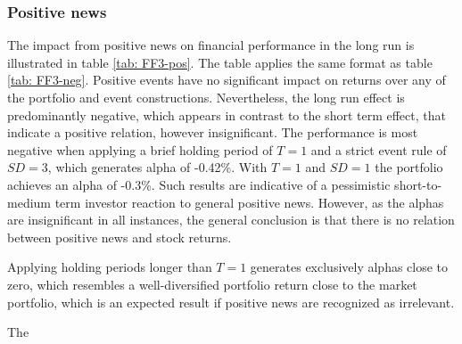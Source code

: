 \subsubsection{Positive news}

The impact from positive news on financial performance in the long run is illustrated in table \ref{tab: FF3-pos}. The table applies the same format as table \ref{tab: FF3-neg}. Positive events have no significant impact on returns over any of the portfolio and event constructions. Nevertheless, the long run effect is predominantly negative, which appears in contrast to the short term effect, that indicate a positive relation, however insignificant. The performance is most negative when applying a brief holding period of $T=1$ and a strict event rule of $SD = 3$, which generates alpha of -0.42\%. With $T=1$ and $SD=1$ the portfolio achieves an alpha of -0.3\%.  
Such results are indicative of a pessimistic short-to-medium term investor reaction to general positive news. However, as the alphas are insignificant in all instances, the general conclusion is that there is no relation between positive news and stock returns. 

Applying holding periods longer than $T=1$ generates exclusively alphas close to zero, which resembles a well-diversified portfolio return close to the market portfolio, which is an expected result if positive news are recognized as irrelevant. 

The 


